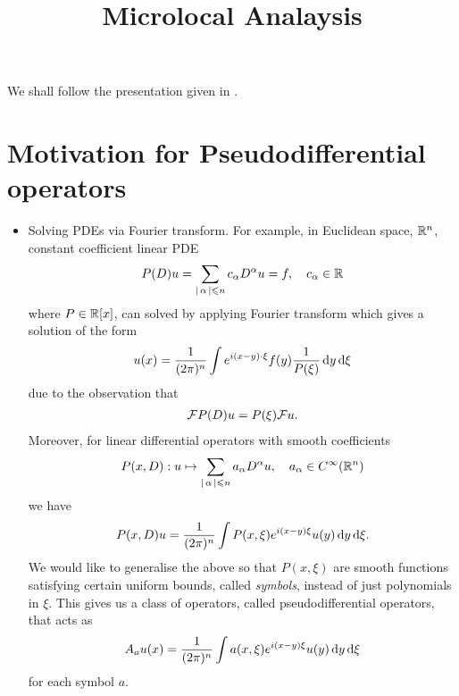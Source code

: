 \documentclass{article}
\title{Microlocal Analaysis}
\date{}
\begin{document}
%  

We shall follow the presentation given in  \cite{melrose intro to microlocal}. 

\section{Motivation for Pseudodifferential operators} 
\begin{itemize}
    \item Solving PDEs via Fourier transform. For example, in Euclidean space, $\R^n$, constant coefficient linear PDE
    \begin{align*}
    P(D) u = \sum_{\abs{\alpha} \leq n} c_\alpha D^{\alpha} u = f, \quad c_\alpha \in \R
    \end{align*}
    where $P \in \R[x]$, can solved by applying Fourier transform which gives a solution of the form
    \begin{align*}
    u(x) = \frac{1}{(2\pi)^n} \int e^{i(x - y)\cdot \xi} f(y) \frac{1}{P(\xi)} \d[y] \d[\xi]
    \end{align*}
    due to the observation that
    \begin{align*}
    \F P(D) u = P(\xi) \F u. 
    \end{align*}
    Moreover, for linear differential operators with smooth coefficients
    \begin{align*}
    P(x, D):  u \mapsto \sum_{\abs{\alpha} \leq n } a_\alpha D^\alpha u, \quad a_\alpha \in C^\infty(\R^n)
    \end{align*}
    we have
    \begin{align*}
    P(x, D) u = \frac{1}{(2\pi)^n} \int P(x, \xi) e^{i(x -y) \xi} u(y)\d[y] \d[\xi].
    \end{align*}
    We would like to generalise the above so that $P(x, \xi)$ are smooth functions satisfying certain uniform bounds, called \emph{symbols}, instead of just polynomials in $\xi$. This gives us a class of operators, called pseudodifferential operators, that acts as 
    \begin{align*}
    A_a u (x) =  \frac{1}{(2\pi)^n} \int a(x, \xi) e^{i(x -y) \xi} u(y)\d[y] \d[\xi]
    \end{align*}
    for each symbol $a$.
    

\end{itemize}
\end{document}
